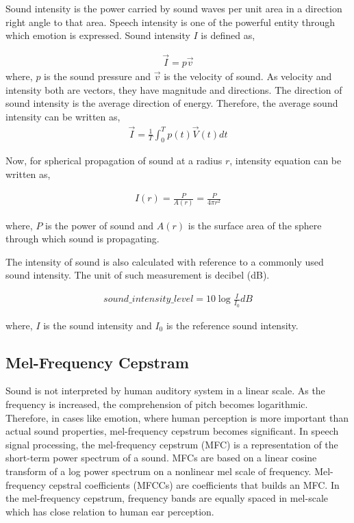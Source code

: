 Sound intensity is the power carried by sound waves per unit area in a direction right angle to that area. Speech intensity is one of the powerful entity through which emotion is expressed. Sound intensity $I$ is defined as,

\begin{align}
    \vec{I} = p\Vec{v}
\end{align}
 where, $p$ is the sound pressure and $\Vec{v}$ is the velocity of sound. As velocity and intensity both are vectors, they have magnitude and directions. The direction of sound intensity is the average direction of energy. Therefore, the average sound intensity can be written as,
 \begin{align}
    \vec{I} = \frac{1}{T}\int_{0}^{T} p(t)\vec{V}(t)dt
\end{align}
 
Now, for spherical propagation of sound at a radius $r$, intensity equation can be written as,

\begin{align}
    I(r) = \frac{P}{A(r)} = \frac{P}{4\pi r^2}
\end{align}

where, $P$ is the power of sound and $A(r)$ is the surface area of the sphere through which sound is propagating. 

The intensity of sound is also calculated with reference to a commonly used sound intensity. The unit of such measurement is decibel (dB).

\begin{align}
    sound\_ intensity\_ level = 10\log \frac{I}{I_0} dB
\end{align}

where, $I$ is the sound intensity and $I_0$ is the reference sound intensity.

\subsection{Mel-Frequency Cepstram}
\label{mfcc}

Sound is not interpreted by human auditory system in a linear scale. As the frequency is increased, the comprehension of pitch becomes logarithmic. Therefore, in cases like emotion, where human perception is more important than actual sound properties, mel-frequency cepstrum becomes significant. In speech signal  processing, the mel-frequency cepstrum (MFC) is a representation of the short-term power spectrum of a sound. MFCs are based on a linear cosine transform of a log power spectrum on a nonlinear mel scale of frequency. Mel-frequency cepstral coefficients (MFCCs) are coefficients that builds an MFC. In the mel-frequency cepstrum, frequency bands are equally spaced in mel-scale which has close relation to human ear perception. 

